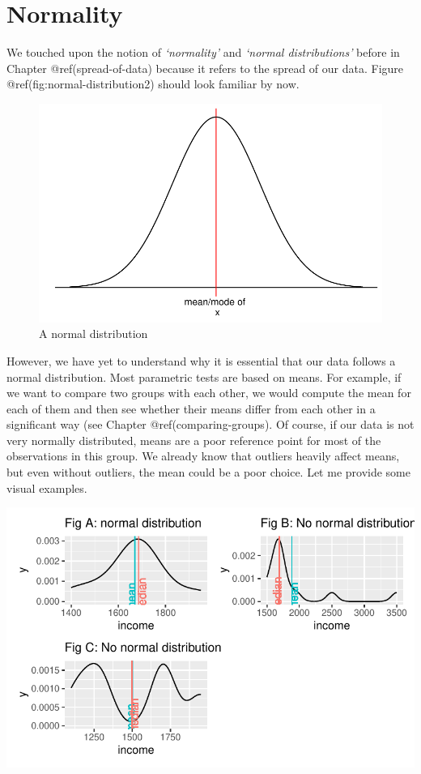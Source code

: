 \documentclass[
  letterpaper,
]{krantz}
\begin{document}
\section{Normality}\label{normality}

We touched upon the notion of \emph{`normality'} and \emph{`normal
distributions'} before in Chapter @ref(spread-of-data) because it refers
to the spread of our data. Figure @ref(fig:normal-distribution2) should
look familiar by now.

\begin{figure}[H]

{\centering \includegraphics{09_sources_of_bias_files/figure-pdf/normal-distribution2-1.pdf}

}

\caption{A normal distribution}

\end{figure}%

However, we have yet to understand why it is essential that our data
follows a normal distribution. Most parametric tests are based on means.
For example, if we want to compare two groups with each other, we would
compute the mean for each of them and then see whether their means
differ from each other in a significant way (see Chapter
@ref(comparing-groups). Of course, if our data is not very normally
distributed, means are a poor reference point for most of the
observations in this group. We already know that outliers heavily affect
means, but even without outliers, the mean could be a poor choice. Let
me provide some visual examples.

\includegraphics{09_sources_of_bias_files/figure-pdf/comparing-distributions-plus-means-1.pdf}
\end{document}
